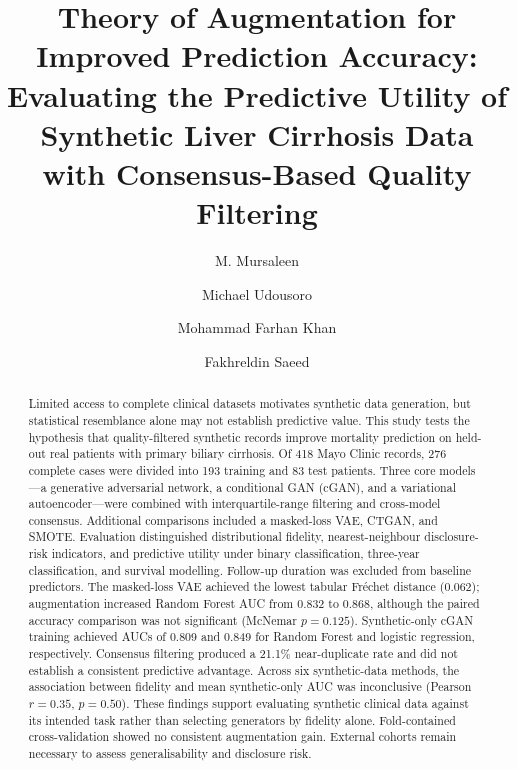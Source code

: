 \documentclass[manuscript,review,screen,nonacm]{acmart}
\newif\ifshowrevisions
\DeclareRobustCommand{\rev}[1]{\ifshowrevisions{\color{revisionblue}#1}\else#1\fi}
\begin{document}
\title[Theory of Augmentation for Improved Prediction Accuracy]{Theory of Augmentation for Improved Prediction Accuracy: Evaluating the Predictive Utility of Synthetic Liver Cirrhosis Data with Consensus-Based Quality Filtering}
\author{M. Mursaleen}
\author{Michael Udousoro}
\author{Mohammad Farhan Khan}
\author{Fakhreldin Saeed}
\renewcommand{\shortauthors}{Mursaleen et al.}
\begin{abstract}
\rev{Limited access to complete clinical datasets motivates synthetic data generation, but statistical resemblance alone may not establish predictive value. This study tests the hypothesis that quality-filtered synthetic records improve mortality prediction on held-out real patients with primary biliary cirrhosis. Of 418 Mayo Clinic records, 276 complete cases were divided into 193 training and 83 test patients. Three core models---a generative adversarial network, a conditional GAN (cGAN), and a variational autoencoder---were combined with interquartile-range filtering and cross-model consensus. Additional comparisons included a masked-loss VAE, CTGAN, and SMOTE. Evaluation distinguished distributional fidelity, nearest-neighbour disclosure-risk indicators, and predictive utility under binary classification, three-year classification, and survival modelling. Follow-up duration was excluded from baseline predictors. The masked-loss VAE achieved the lowest tabular Fr\'{e}chet distance (0.062); augmentation increased Random Forest AUC from 0.832 to 0.868, although the paired accuracy comparison was not significant (McNemar $p=0.125$). Synthetic-only cGAN training achieved AUCs of 0.809 and 0.849 for Random Forest and logistic regression, respectively. Consensus filtering produced a 21.1\% near-duplicate rate and did not establish a consistent predictive advantage. Across six synthetic-data methods, the association between fidelity and mean synthetic-only AUC was inconclusive (Pearson $r=0.35$, $p=0.50$). These findings support evaluating synthetic clinical data against its intended task rather than selecting generators by fidelity alone. Fold-contained cross-validation showed no consistent augmentation gain. External cohorts remain necessary to assess generalisability and disclosure risk.}
\end{abstract}
\end{document}
